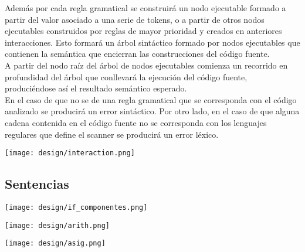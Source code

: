 \begin{multicols}{2}
Además por cada regla gramatical se construirá un nodo ejecutable formado a partir del valor asociado a una serie de tokens, o 
a partir de otros nodos ejecutables construidos por reglas de mayor prioridad y creados en 
anteriores interacciones. Esto formará un árbol sintáctico formado por nodos ejecutables que 
contienen la semántica que encierran las construcciones del código fuente.\\

A partir del nodo raíz del árbol de nodos ejecutables comienza un recorrido en profundidad del
árbol que conllevará la ejecución del código fuente, produciéndose así el resultado semántico 
esperado.\\

En el caso de que no se de una regla gramatical que se corresponda con el código analizado se 
producirá un error sintáctico. Por otro lado, en el caso de que alguna cadena contenida
en el código fuente no se corresponda con los lenguajes regulares que define el scanner
se producirá un error léxico.

\columnbreak 
\begin{center}
\texttt{[image: design/interaction.png]} 
\end{center}
\end{multicols}

\subsection{Sentencias}
\begin{center}
\texttt{[image: design/if\_componentes.png]} 
\end{center}

\begin{center}
\texttt{[image: design/arith.png]} 
\end{center}

\begin{center}
\texttt{[image: design/asig.png]} 
\end{center}

